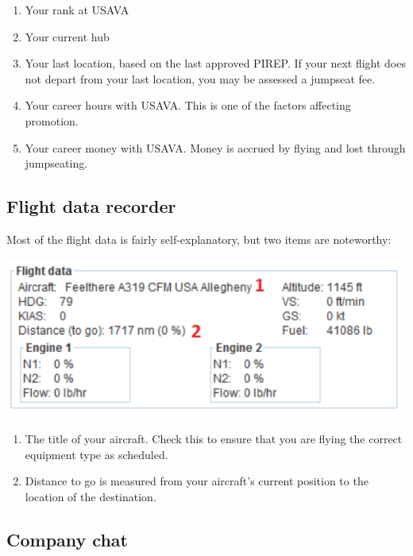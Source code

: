 \documentclass[12pt]{article}
\begin{document}
\begin{enumerate}
\item{Your rank at USAVA}
\item{Your current hub}
\item{Your last location, based on the last approved PIREP. If your next flight does not depart from your last location, you may be assessed a jumpseat fee.}
\item{Your career hours with USAVA. This is one of the factors affecting promotion.}
\item{Your career money with USAVA. Money is accrued by flying and lost through jumpseating.}
\end{enumerate}

\subsection{Flight data recorder}

Most of the flight data is fairly self-explanatory, but two items are noteworthy:

\begin{center}
\includegraphics[scale=1]{Image8.pdf}
\end{center} 

\begin{enumerate}
\item{The title of your aircraft. Check this to ensure that you are flying the correct equipment type as scheduled.}
\item{Distance to go is measured from your aircraft’s current position to the location of the destination.}
\end{enumerate}

\subsection{Company chat}
\end{document}
